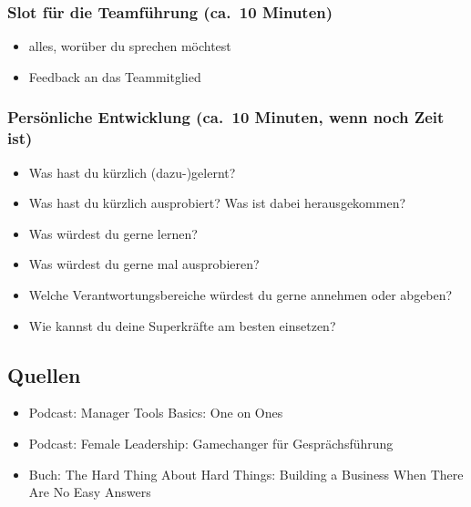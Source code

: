\subsubsection{Slot für die Teamführung (ca.~10 Minuten)}
\begin{itemize}
 \item alles, worüber du sprechen möchtest
 \item Feedback an das Teammitglied
\end{itemize}


\subsubsection{Persönliche Entwicklung (ca.~10 Minuten, wenn noch Zeit ist)}
\begin{itemize}
 \item Was hast du kürzlich (dazu-)gelernt?
 \item Was hast du kürzlich ausprobiert? Was ist dabei herausgekommen?
 \item Was würdest du gerne lernen?
 \item Was würdest du gerne mal ausprobieren?
 \item Welche Verantwortungsbereiche würdest du gerne annehmen oder abgeben?
 \item Wie kannst du deine Superkräfte am besten einsetzen?
\end{itemize}

\subsection{Quellen}

\begin{itemize}
 \item Podcast: Manager Tools Basics: One on Ones \cite[04.\,07.\,2005 bis 11.\,07.\,2005]{manager-tools-basics}
 \item Podcast: Female Leadership: Gamechanger für Gesprächsführung \cite[Folge 15]{female-leadership-gespraechsfuehrung}
 \item Buch: The Hard Thing About Hard Things: Building a Business When There Are No Easy Answers \cite{the-hard-thing-about-hard-things}
\end{itemize}

